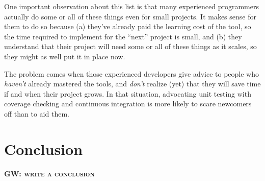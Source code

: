 \documentclass[10pt]{article}
\newcommand{\fixme}[2]{\textsc{\textbf{{#1}: {#2}}}}
\begin{document}
One important observation about this list is that many experienced
programmers actually do some or all of these things even for small
projects. It makes sense for them to do so because (a) they've already
paid the learning cost of the tool, so the time required to implement
for the ``next'' project is small, and (b) they understand that their
project will need some or all of these things as it scales, so they
might as well put it in place now.

The problem comes when those experienced developers give advice to
people who \emph{haven't} already mastered the tools, and
\emph{don't} realize (yet) that they will save time if and when their
project grows.  In that situation, advocating unit testing with
coverage checking and continuous integration is more likely to scare
newcomers off than to aid them.

\section{Conclusion}\label{sec:conclusion}

\fixme{GW}{write a conclusion}


\end{document}

